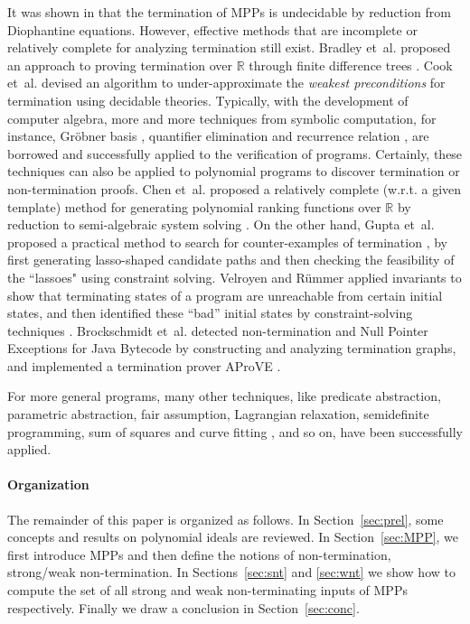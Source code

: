 \documentclass{jssc}
\begin{document}
It was shown in \cite{bradley:polynomial} that the termination of MPPs is undecidable by reduction from Diophantine equations. However, effective methods that are incomplete or relatively complete for analyzing termination still exist. Bradley et~al. proposed an approach to proving termination over $\mathbb{R}$ through finite difference trees \cite{bradley:polynomial}. Cook et~al. \cite{cook:conditional} devised an algorithm to under-approximate the \emph{weakest preconditions} for termination using decidable theories. Typically, with the development of computer algebra, more and more techniques from symbolic computation, for instance, Gr\"{o}bner basis \cite{sank:GB,muller:invariants}, quantifier elimination \cite{kapur:QE} and recurrence relation \cite{rodriguez:simple,kovacs:psolvable}, are borrowed and successfully applied to the verification of  programs. Certainly, these techniques can also be applied to polynomial programs to discover termination or non-termination proofs. Chen et~al. proposed a relatively complete (w.r.t. a given template) method for generating polynomial ranking functions over $\mathbb{R}$ by reduction to semi-algebraic system solving \cite{chen:ranking}. On the other hand, Gupta et~al. proposed a practical method to search for counter-examples of termination \cite{gupta:NT}, by first generating lasso-shaped \cite{cook:code} candidate paths and then checking the feasibility of the ``lassoes" using constraint solving. Velroyen and R\"{u}mmer applied invariants to show that terminating states of a program are unreachable from certain initial states, and then identified these ``bad'' initial states by constraint-solving techniques \cite{Velroyen08}. Brockschmidt et~al. detected non-termination and Null Pointer Exceptions for \textsf{Java Bytecode} by constructing and analyzing termination graphs, and implemented a termination prover \textsf{AProVE} \cite{Brockschmidt11}.

For more general programs, many other techniques, like predicate abstraction, parametric abstraction, fair assumption, Lagrangian relaxation, semidefinite programming, sum of squares and curve fitting \cite{cousot:lagrangian,shen:curve}, and so on, have been successfully applied.

\paragraph{Organization}
The remainder of this paper is organized as follows. In Section~\ref{sec:prel}, some concepts and results on polynomial ideals are reviewed. In Section~\ref{sec:MPP}, we first introduce MPPs and then define the notions of non-termination, strong/weak non-termination. In Sections~\ref{sec:snt} and \ref{sec:wnt} we show how to compute the set of all strong and weak non-terminating inputs of MPPs respectively. Finally we draw a conclusion in Section~\ref{sec:conc}.
\end{document}
